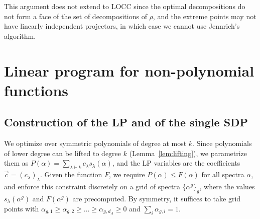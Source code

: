 \documentclass[11pt,a4paper]{report}
\renewcommand{\a}{\alpha}
\newcounter{reptag}
\newif\iftags \tagsfalse   %
\newcommand{\reptagbox}[3]{\iftags\par\smallskip\noindent\refstepcounter{reptag}%
  \fcolorbox{#1}{#1!7}{\parbox{\dimexpr\linewidth-2\fboxsep-2\fboxrule\relax}{\small
  \textcolor{#1}{\textbf{[\thereptag]\ #2.}}\ #3}}\par\smallskip\fi}
\newcommand{\deeper}[1]{\reptagbox{tagP}{Deeper proof}{#1}}
\begin{document}
This argument does not extend to LOCC since the optimal decompositions do not form a face of the set of decompositions of $\rho$, and the extreme points may not have linearly independent projectors, in which case we cannot use Jennrich's algorithm.
\deeper{This is the least detailed proof and worth the most care. (i) In the observation, say why $\sum_ic_i=0$: take the trace of $\sum_ic_i\dyad{\psi_i}=0$. (ii) Justify that the minimiser of $\tr(R\,\cdot)$ is unique for almost every $R$ (a compact convex set has a unique minimiser outside a measure-zero set of directions). (iii) Justify that Jennrich's algorithm is continuous at $\omega_3(\mu_e)$: generic distinct eigenvalues of the random contraction plus eigenvector perturbation bounds. (iv) Jennrich needs the terms to be linearly independent in a space of dimension $r^2$, consistent with the Carath\'eodory count above. (v) Write ``increase $t$ until a weight vanishes and repeat'' as an induction on the number of terms.}

\chapter{Linear program for non-polynomial functions}\label{app:LPchap}

\section{Construction of the LP and of the single SDP}\label{app:LP}
We optimize over symmetric polynomials of degree at most $k$. Since polynomials of lower degree can be lifted to degree $k$ (Lemma~\ref{lem:lifting}), we parametrize them as $P(\a)=\sum_{\lambda\vdash k}c_\lambda s_\lambda(\a)$, and the LP variables are the coefficients $\vec c=(c_\lambda)_\lambda$. Given the function $F$, we require $P(\a)\leq F(\a)$ for all spectra $\a$, and enforce this constraint discretely on a grid of spectra $\{\a^g\}_g$, where the values $s_\lambda(\a^g)$ and $F(\a^g)$ are precomputed. By symmetry, it suffices to take grid points with $\a_{g,1}\geq\a_{g,2}\geq\dots\geq\a_{g,d_A}\geq0$ and $\sum_i\a_{g,i}=1$.
\end{document}
